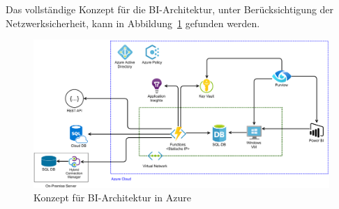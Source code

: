 Das vollständige Konzept für die BI-Architektur, unter Berücksichtigung der Netzwerksicherheit, kann in Abbildung~\ref{fig:chap03_4_konzeptArchitektur} gefunden werden.
 
 \begin{figure}[htbp]
 \centering
 \includegraphics[width=\textwidth]{gfx/konzept_2.png}
 \caption{Konzept für BI-Architektur in Azure}
\label{fig:chap03_4_konzeptArchitektur}
\end{figure}